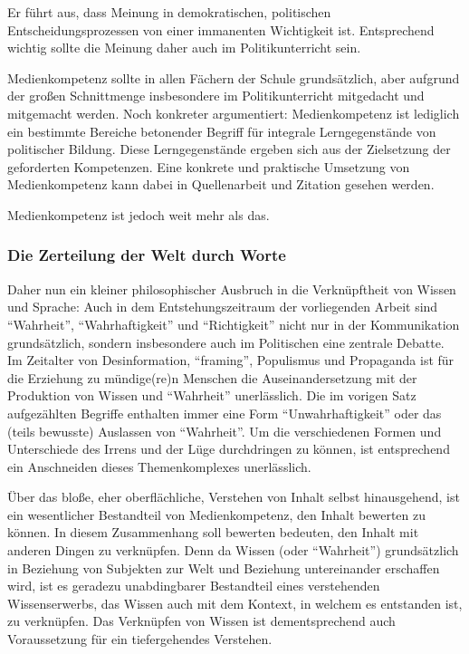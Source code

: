 Er führt aus, dass Meinung in demokratischen, politischen Entscheidungsprozessen von einer immanenten Wichtigkeit ist. Entsprechend wichtig sollte die Meinung daher auch im Politikunterricht sein.


Medienkompetenz sollte in allen Fächern der Schule grundsätzlich, aber aufgrund der großen Schnittmenge insbesondere im Politikunterricht mitgedacht und mitgemacht werden. 
Noch konkreter argumentiert: Medienkompetenz ist lediglich ein bestimmte Bereiche betonender Begriff für integrale Lerngegenstände von politischer Bildung. Diese Lerngegenstände ergeben sich aus der Zielsetzung der geforderten Kompetenzen. Eine konkrete und praktische Umsetzung von Medienkompetenz kann dabei in Quellenarbeit und Zitation gesehen werden. 

Medienkompetenz ist jedoch weit mehr als das. 
 
\subsubsection{Die Zerteilung der Welt durch Worte}
Daher nun ein kleiner philosophischer Ausbruch in die Verknüpftheit von Wissen und Sprache: Auch in dem Entstehungszeitraum der vorliegenden Arbeit sind \enquote{Wahrheit}, \enquote{Wahrhaftigkeit} und \enquote{Richtigkeit} nicht nur in der Kommunikation grundsätzlich, sondern insbesondere auch im Politischen eine zentrale Debatte. 
Im Zeitalter von Desinformation, \enquote{framing}, Populismus und Propaganda ist für die Erziehung zu mündige(re)n Menschen die Auseinandersetzung mit der Produktion von Wissen und \enquote{Wahrheit} unerlässlich. Die im vorigen Satz aufgezählten Begriffe enthalten immer eine Form \enquote{Unwahrhaftigkeit} oder das (teils bewusste) Auslassen von \enquote{Wahrheit}. Um die verschiedenen Formen und Unterschiede des Irrens und der Lüge durchdringen zu können, ist entsprechend ein Anschneiden dieses Themenkomplexes unerlässlich.  

Über das bloße, eher oberflächliche, Verstehen von Inhalt selbst hinausgehend, ist ein wesentlicher Bestandteil von Medienkompetenz, den Inhalt bewerten zu können. In diesem Zusammenhang soll bewerten bedeuten, den Inhalt mit anderen Dingen zu verknüpfen. Denn da Wissen (oder \enquote{Wahrheit}) grundsätzlich in Beziehung von Subjekten zur Welt und Beziehung untereinander erschaffen wird, ist es geradezu unabdingbarer Bestandteil eines verstehenden Wissenserwerbs, das Wissen auch mit dem Kontext, in welchem es entstanden ist, zu verknüpfen. Das Verknüpfen von Wissen ist dementsprechend auch Voraussetzung für ein tiefergehendes Verstehen. 

